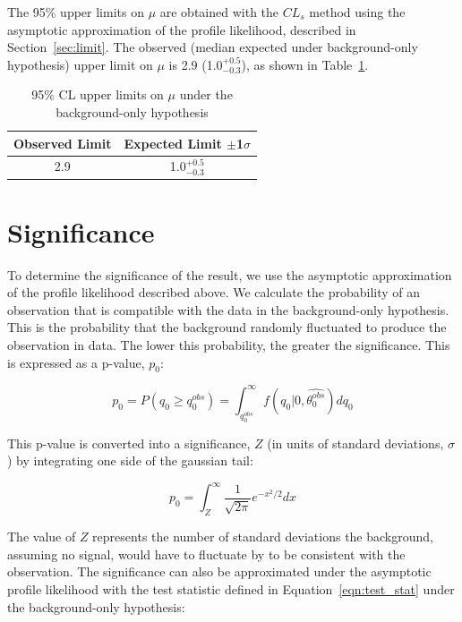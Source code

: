 The 95$\%$ upper limits on $\mu$ are obtained with the $CL_{s}$ method using the asymptotic approximation of the profile likelihood, described in Section~\ref{sec:limit}.
The observed (median expected under background-only hypothesis) upper limit on $\mu$ is 2.9 (1.0$^{+0.5}_{-0.3}$), as shown in Table~\ref{tab:limits}.

\begin{table}[htbp]
\begin{center}
  \caption[FINAL LIMITS]{95$\%$ CL upper limits on $\mu$ under the background-only hypothesis}
    \begin{tabular}{c c} \hline
      Observed Limit & Expected Limit $\pm$1$\sigma$  \\ \hline 
      2.9 & 1.0$^{+0.5}_{-0.3}$  \\
      \hline
    \end{tabular}
    \label{tab:limits}
\end{center}
\end{table}



\section{Significance}
To determine the significance of the result, we use the asymptotic approximation of the profile likelihood described above. We calculate the probability of an observation that is compatible with the
data in the background-only hypothesis. This is the probability that the background randomly fluctuated to produce the observation in data. The lower this probability, the greater the significance.
This is expressed as a p-value, $p_{0}$:

\begin{equation}
\label{eqn:signif1}
p_{0} = P(q_{0} \geq q_{0}^{obs}) = \int_{q_{0}^{obs}}^{\infty} f(q_{0}|0,\hat{\theta_{0}^{obs}}) dq_{0}
\end{equation}

\noindent This p-value is converted into a significance, $Z$ (in units of standard deviations, $\sigma$) by integrating one side of the gaussian tail:

\begin{equation}
\label{eqn:signif2}
p_{0} = \int_{Z}^{\infty} \frac{1}{\sqrt{2\pi}}e^{-x^{2}/2} dx
\end{equation}

\noindent The value of $Z$ represents the number of standard deviations the background, assuming no signal, would have to fluctuate by to be consistent with the observation. 
The significance can also be approximated under the asymptotic profile likelihood with the test statistic defined in Equation~\ref{eqn:test_stat} under the background-only hypothesis:

